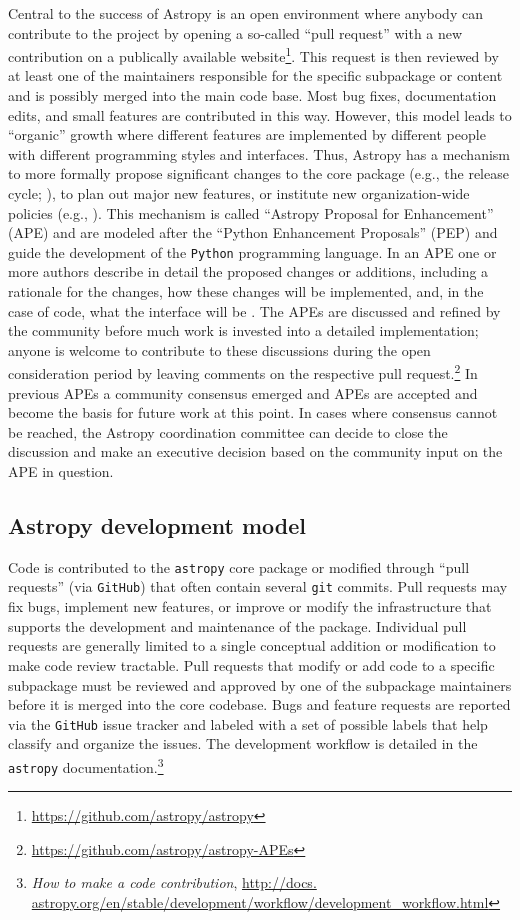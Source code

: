 \documentclass[modern]{aastex61}
\newcommand{\package}[1]{\texttt{#1}\xspace}
\newcommand{\github}{\package{GitHub}}
\newcommand{\python}{\package{Python}}
\newcommand{\astropy}{Astropy\xspace}
\newcommand{\astropypkg}{\package{astropy}}
\begin{document}
Central to the success of \astropy is an open environment where anybody can
contribute to the project by opening a so-called ``pull request'' with a new
contribution on a publically available
website\footnote{\url{https://github.com/astropy/astropy}}.
This request is then reviewed by at least one of the maintainers responsible for
the specific subpackage or content and is possibly merged into the main code
base.
Most bug fixes, documentation edits, and small features are contributed in this
way.
However, this model leads to ``organic'' growth where different features are
implemented by different people with different programming styles and
interfaces.
Thus, \astropy has a mechanism to more formally propose significant changes to
the core package (e.g., the release cycle; \citealt{ape2}), to plan out major
new features, or institute new organization-wide policies (e.g.,
\citealt{ape8}).
This mechanism is called ``Astropy Proposal for Enhancement'' (APE) and are
modeled after the ``Python Enhancement Proposals'' (PEP) and guide the
development of the \python programming language.
In an APE one or more authors describe in detail the proposed changes or
additions, including a rationale for the changes, how these changes will be
implemented, and, in the case of code, what the interface will be \citep{ape1}.
The APEs are discussed and refined by the community before much work is invested
into a detailed implementation; anyone is welcome to contribute to these
discussions during the open consideration period by leaving comments on the
respective pull request.\footnote{\url{https://github.com/astropy/astropy-APEs}}
In previous APEs a community consensus emerged and APEs are accepted and become
the basis for future work at this point.
In cases where consensus cannot be reached, the
\astropy coordination committee can decide to close the discussion and
make an executive decision based on the community input on the APE in question.

\subsection{Astropy development model}

Code is contributed to the \astropypkg core package or modified through ``pull
requests'' (via \github) that often contain several \texttt{git} commits.
Pull requests may fix bugs, implement new features, or improve or modify the
infrastructure that supports the development and maintenance of the package.
Individual pull requests are generally limited to a single conceptual addition
or modification to make code review tractable.
Pull requests that modify or add code to a specific subpackage must be reviewed
and approved by one of the subpackage maintainers before it is merged into the
core codebase.
Bugs and feature requests are reported via the \github issue tracker and labeled
with a set of possible labels that help classify and organize the issues.
The development workflow is detailed in the \astropypkg
documentation.\footnote{\emph{How to make a code contribution}, \url{http://docs.
astropy.org/en/stable/development/workflow/development_workflow.html}}
\end{document}
